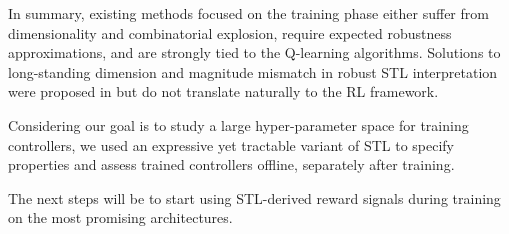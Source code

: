 \documentclass[anonymous=true,format=sigconf, screen=true, review=false]{acmart}
\begin{document}
In summary, existing methods focused on the training phase either suffer
from dimensionality and combinatorial explosion, require expected
robustness approximations, and are strongly tied to the
Q-learning algorithms. Solutions to long-standing dimension and magnitude
mismatch in robust STL interpretation were proposed in
\cite{2019zhangbandits} but do not translate naturally to the RL
framework.

Considering our goal is to study a large hyper-parameter space for
training controllers, we used an expressive yet tractable variant of
STL to specify properties and assess trained controllers offline, separately after training.



The next steps will be to start
using STL-derived reward signals during training on the most promising
architectures.






\end{document}
